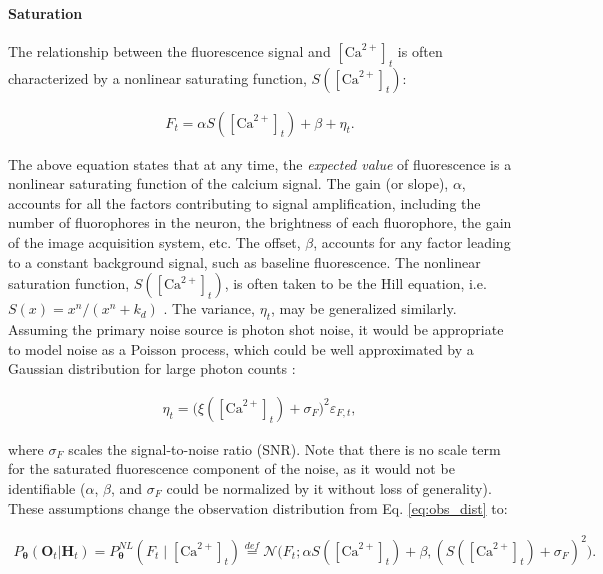 \documentclass[10pt]{article}
\providecommand{\ve}[1]{\boldsymbol{#1}}
\providecommand{\ve}[1]{\boldsymbol{#1}}
\newcommand{\thetn}{\ve{\theta}}
\newcommand{\p}{P_{\thetn}}
\newcommand{\Ca}{[\text{Ca}^{2+}]}
\begin{document}

\paragraph{Saturation}

The relationship between the fluorescence signal and $\Ca_t$ is often characterized by a nonlinear saturating function, $S(\Ca_t)$:

\begin{align} \label{eq:mean_obs}
F_t = \alpha S(\Ca_t) + \beta + \eta_t.
\end{align} 

\noindent The above equation states that at any time, the \emph{expected value} of fluorescence is a nonlinear saturating function of the calcium signal.  The gain (or slope), $\alpha$, accounts for all the factors contributing to signal amplification, including the number of fluorophores in the neuron, the brightness of each fluorophore, the gain of the image acquisition system, etc.  The offset, $\beta$, accounts for any factor leading to a constant background signal, such as baseline fluorescence. The nonlinear saturation function, $S(\Ca_t)$, is often taken to be the Hill equation, i.e. $S(x)=x^n/(x^n+k_d)$ \cite{YasudaSvoboda04}. The variance, $\eta_t$, may be generalized similarly.  Assuming the primary noise source is photon shot noise, it would be appropriate to model noise as a Poisson process, which could be well approximated by a Gaussian distribution for large photon counts \cite{SjulsonMiesenbock07}:

\begin{align} \label{eq:var_obs}
\eta_t = \big(\xi(\Ca_t) + \sigma_F\big)^2 \varepsilon_{F,t},
\end{align} 

\noindent where $\sigma_F$ scales the signal-to-noise ratio (SNR).  Note that there is no scale term for the saturated fluorescence component of the noise, as it would not be identifiable ($\alpha$, $\beta$, and $\sigma_F$ could be normalized by it without loss of generality). These assumptions change the observation distribution from Eq. \ref{eq:obs_dist} to:

\begin{align} \label{eq:nonlin}
\p(\ve{O}_t | \ve{H}_t) =   \p^{NL}(F_t \mid \Ca_t) \overset{def}{=} \mathcal{N}\big(F_t; \alpha S(\Ca_t) + \beta, (S(\Ca_t)+\sigma_F)^2\big).
\end{align}
\end{document}
